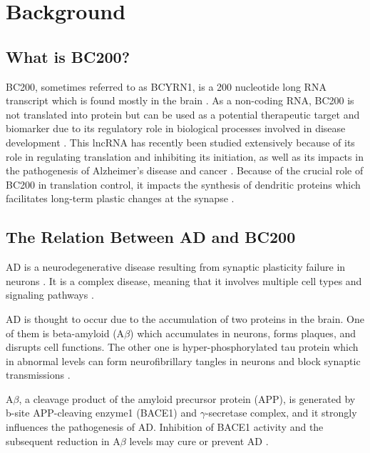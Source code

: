 \documentclass[conference, 11pt]{IEEEtran}
\begin{document}
\section{Background}\label{sec:background}

\subsection{What is BC200?}

BC200, sometimes referred to as BCYRN1, is a 200 nucleotide long RNA transcript which is found mostly in the brain \cite{tiedge1993primary}. 
As a non-coding RNA, BC200 is not translated into protein but can be used as a potential therapeutic target and biomarker due to its regulatory role in biological processes involved in disease development \cite{zhang2021role,mus2007dendritic}. 
This lncRNA has recently been studied extensively because of its role in regulating translation and inhibiting its initiation, as well as its impacts in the pathogenesis of Alzheimer's disease and cancer \cite{zhang2021role,tiedge1993primary}. 
Because of the crucial role of BC200 in translation control, it impacts the synthesis of dendritic proteins which facilitates long-term plastic changes at the synapse \cite{mus2007dendritic}.

\subsection{The Relation Between AD and BC200}

AD is a neurodegenerative disease resulting from synaptic plasticity failure in neurons \cite{mus2007dendritic}. 
It is a complex disease, meaning that it involves multiple cell types and signaling pathways \cite{zhang2021role}.

AD is thought to occur due to the accumulation of two proteins in the brain. 
One of them is beta-amyloid (A$\beta$) which accumulates in neurons, forms plaques, and disrupts cell functions. 
The other one is hyper-phosphorylated tau protein which in abnormal levels can form neurofibrillary tangles in neurons and block synaptic transmissions \cite{zhang2021role}.

A$\beta$, a cleavage product of the amyloid precursor protein (APP), is generated by b-site APP-cleaving enzyme1 (BACE1) and $\gamma$-secretase complex, and it strongly influences the pathogenesis of AD. 
Inhibition of BACE1 activity and the subsequent reduction in A$\beta$ levels may cure or prevent AD \cite{li2018identification,zhang2021role}.
\end{document}
